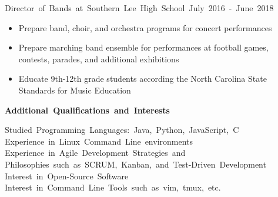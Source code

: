 \documentclass[12pt]{letter}
\begin{document}
    \vspace{2 mm}
    \hbox{Director of Bands at Southern Lee High School \hspace{70pt}
        July 2016 - June 2018}
    \vspace{-5 mm}
    \begin{itemize}
        \itemsep 0em
        \item Prepare band, choir, and orchestra programs for concert 
            performances
        \item Prepare marching band ensemble for performances at football
            games, contests, parades, and additional exhibitions
        \item Educate 9th-12th grade students according the North Carolina
            State Standards for Music Education
    \end{itemize}

    \vspace {10 mm}
    \hbox{\textbf{\large {Additional Qualifications and Interests}}}
    \vspace{3 mm}

    \hbox{Studied Programming Languages: Java, Python, JavaScript, C}
    \hbox{Experience in Linux Command Line environments}
    \hbox{Experience in Agile Development Strategies and} 
    \hbox{\quad Philosophies such as SCRUM, Kanban, 
        and Test-Driven Development}
    \hbox{Interest in Open-Source Software}
    \hbox{Interest in Command Line Tools such as vim, tmux, etc.}
\end{document}
